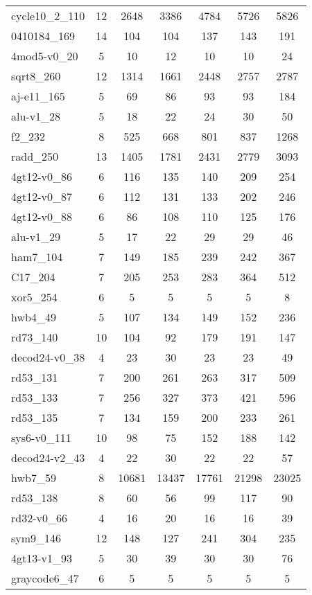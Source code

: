 \documentclass[journal]{IEEEtran}
\begin{document}
\begin{table*}[htbp]
\begin{center}
\begin{tabular}{|p{4.3cm}<{\centering}|c|c|c|c|c|c|}
				cycle10\_2\_110 & 12 & 2648 & 3386 & 4784 & 5726 & 5826 \\ 
				0410184\_169 & 14 & 104 & 104 & 137 & 143 & 191 \\ 
				4mod5-v0\_20 & 5 & 10 & 12 & 10 & 10 & 24 \\ 
				sqrt8\_260 & 12 & 1314 & 1661 & 2448 & 2757 & 2787 \\ 
				aj-e11\_165 & 5 & 69 & 86 & 93 & 93 & 184 \\ 
				alu-v1\_28 & 5 & 18 & 22 & 24 & 30 & 50 \\ 
				f2\_232 & 8 & 525 & 668 & 801 & 837 & 1268 \\ 
				radd\_250 & 13 & 1405 & 1781 & 2431 & 2779 & 3093 \\ 
				4gt12-v0\_86 & 6 & 116 & 135 & 140 & 209 & 254 \\ 
				4gt12-v0\_87 & 6 & 112 & 131 & 133 & 202 & 246 \\ 
				4gt12-v0\_88 & 6 & 86 & 108 & 110 & 125 & 176 \\ 
				alu-v1\_29 & 5 & 17 & 22 & 29 & 29 & 46 \\ 
				ham7\_104 & 7 & 149 & 185 & 239 & 242 & 367 \\ 
				C17\_204 & 7 & 205 & 253 & 283 & 364 & 512 \\ 
				xor5\_254 & 6 & 5 & 5 & 5 & 5 & 8 \\ 
				hwb4\_49 & 5 & 107 & 134 & 149 & 152 & 236 \\ 
				rd73\_140 & 10 & 104 & 92 & 179 & 191 & 147 \\ 
				decod24-v0\_38 & 4 & 23 & 30 & 23 & 23 & 49 \\ 
				rd53\_131 & 7 & 200 & 261 & 263 & 317 & 509 \\ 
				rd53\_133 & 7 & 256 & 327 & 373 & 421 & 596 \\ 
				rd53\_135 & 7 & 134 & 159 & 200 & 233 & 261 \\ 
				sys6-v0\_111 & 10 & 98 & 75 & 152 & 188 & 142 \\ 
				decod24-v2\_43 & 4 & 22 & 30 & 22 & 22 & 57 \\ 
				hwb7\_59 & 8 & 10681 & 13437 & 17761 & 21298 & 23025 \\ 
				rd53\_138 & 8 & 60 & 56 & 99 & 117 & 90 \\ 
				rd32-v0\_66 & 4 & 16 & 20 & 16 & 16 & 39 \\ 
				sym9\_146 & 12 & 148 & 127 & 241 & 304 & 235 \\ 
				4gt13-v1\_93 & 5 & 30 & 39 & 30 & 30 & 76 \\ 
				graycode6\_47 & 6 & 5 & 5 & 5 & 5 & 5 \\ 

\end{tabular}
\end{center}
\end{table*}
\end{document}
